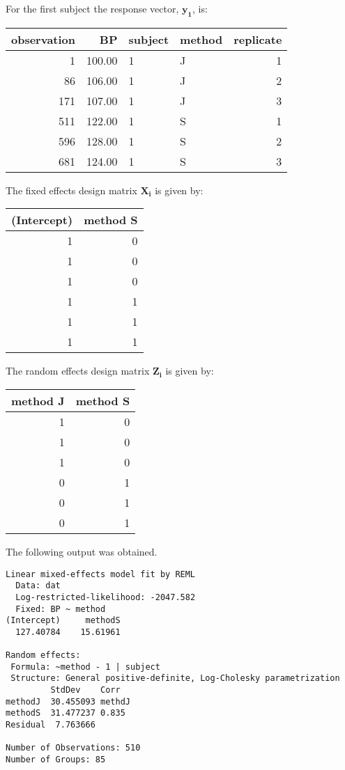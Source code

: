 \documentclass[12pt, a4paper]{article}
\begin{document}
For the first subject the response vector, $\boldsymbol{y_{1}}$, is:
\begin{table}[ht]
\begin{center}
\begin{tabular}{rrllr}
  \hline
observation & BP & subject & method & replicate \\
  \hline
1 & 100.00 & 1 & J &   1 \\
  86 & 106.00 & 1 & J &   2 \\
  171 & 107.00 & 1 & J &   3 \\
  511 & 122.00 & 1 & S &   1 \\
  596 & 128.00 & 1 & S &   2 \\
  681 & 124.00 & 1 & S &   3 \\
   \hline
\end{tabular}
\end{center}
\end{table}
\newpage
The fixed effects design matrix $\boldsymbol{X_{i}}$ is given by:
\begin{table}[ht]
\begin{center}
\begin{tabular}{r|r}
  \hline
  (Intercept) & method S \\
  \hline
 1 & 0 \\
 1 & 0 \\
 1 & 0 \\
 1 & 1 \\
 1 & 1 \\
 1 & 1 \\
   \hline
\end{tabular}
\end{center}
\end{table}

The random effects design matrix $\boldsymbol{Z_{i}}$ is given by:
\begin{table}[ht]
\begin{center}
\begin{tabular}{r|r}
  \hline
 method J & method S \\
  \hline
 1 & 0 \\
 1 & 0 \\
 1 & 0 \\
 0 & 1 \\
 0 & 1 \\
 0 & 1 \\
   \hline
\end{tabular}
\end{center}
\end{table}
\newpage
The following output was obtained.
\begin{verbatim}
Linear mixed-effects model fit by REML
  Data: dat
  Log-restricted-likelihood: -2047.582
  Fixed: BP ~ method
(Intercept)     methodS
  127.40784    15.61961

Random effects:
 Formula: ~method - 1 | subject
 Structure: General positive-definite, Log-Cholesky parametrization
         StdDev    Corr
methodJ  30.455093 methdJ
methodS  31.477237 0.835
Residual  7.763666

Number of Observations: 510
Number of Groups: 85

\end{verbatim}
\newpage
\newpage
\end{document}
